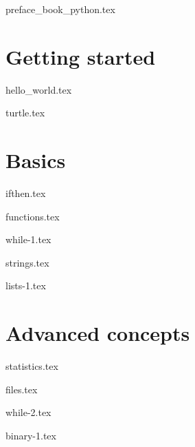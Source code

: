 \documentclass[11pt]{report}
\begin{document}

{preface_book_python.tex}
\debutchapitres
{}


\clearemptydoublepage



\part{Getting started}

{hello_world.tex}

{turtle.tex}



\part{Basics}

{ifthen.tex}

{functions.tex}

{while-1.tex}

{strings.tex}

{lists-1.tex}



\part{Advanced concepts}

{statistics.tex}

{files.tex}

{while-2.tex}

{binary-1.tex}
\end{document}
